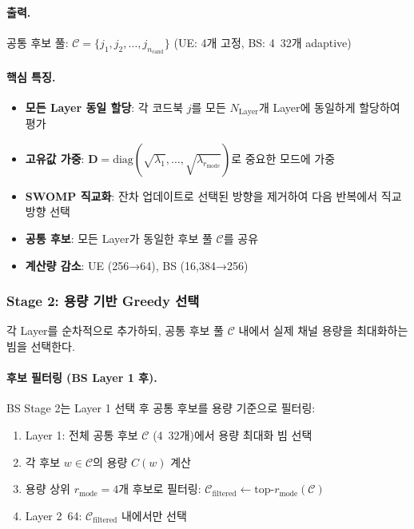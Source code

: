 \documentclass[10pt]{article}
\begin{document}
\paragraph{출력.}
공통 후보 풀: $\mathcal{C} = \{j_1, j_2, \ldots, j_{n_{\text{cand}}}\}$ (UE: 4개 고정, BS: 4~32개 adaptive)

\paragraph{핵심 특징.}
\begin{itemize}
    \item \textbf{모든 Layer 동일 할당}: 각 코드북 $j$를 모든 $N_{\text{Layer}}$개 Layer에 동일하게 할당하여 평가
    \item \textbf{고유값 가중}: $\mathbf{D} = \text{diag}(\sqrt{\lambda_1}, \ldots, \sqrt{\lambda_{r_{\text{mode}}}})$로 중요한 모드에 가중
    \item \textbf{SWOMP 직교화}: 잔차 업데이트로 선택된 방향을 제거하여 다음 반복에서 직교 방향 선택
    \item \textbf{공통 후보}: 모든 Layer가 동일한 후보 풀 $\mathcal{C}$를 공유
    \item \textbf{계산량 감소}: UE (256→64), BS (16,384→256)
\end{itemize}

\subsubsection{Stage 2: 용량 기반 Greedy 선택}

각 Layer를 순차적으로 추가하되, 공통 후보 풀 $\mathcal{C}$ 내에서 실제 채널 용량을 최대화하는 빔을 선택한다.

\paragraph{후보 필터링 (BS Layer 1 후).}
BS Stage 2는 Layer 1 선택 후 공통 후보를 용량 기준으로 필터링:
\begin{enumerate}
    \item Layer 1: 전체 공통 후보 $\mathcal{C}$ (4~32개)에서 용량 최대화 빔 선택
    \item 각 후보 $w \in \mathcal{C}$의 용량 $C(w)$ 계산
    \item 용량 상위 $r_{\text{mode}}=4$개 후보로 필터링: $\mathcal{C}_{\text{filtered}} \gets \text{top-}r_{\text{mode}}(\mathcal{C})$
    \item Layer 2~64: $\mathcal{C}_{\text{filtered}}$ 내에서만 선택
\end{enumerate}
\end{document}
